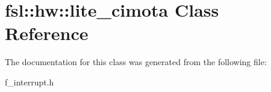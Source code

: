 \hypertarget{classfsl_1_1hw_1_1lite__cimota}{}\section{fsl\+::hw\+::lite\+\_\+cimota Class Reference}
\label{classfsl_1_1hw_1_1lite__cimota}


The documentation for this class was generated from the following file\+:\begin{DoxyCompactItemize}
\item 
f\+\_\+interrupt.\+h\end{DoxyCompactItemize}
